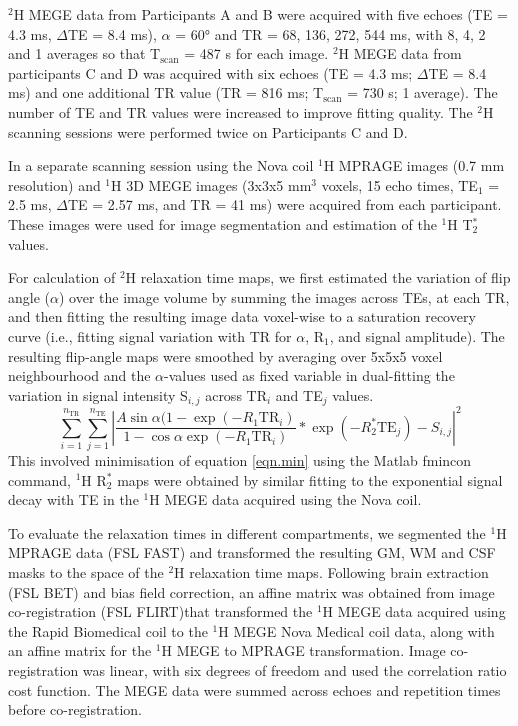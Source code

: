 \documentclass[class=article, crop=false]{standalone}
\begin{document}
$^2$H MEGE data from Participants A and B were acquired with five echoes (TE = 4.3 ms, $\Delta$TE = 8.4 ms), $\alpha$ = 60° and TR = 68, 136, 272, 544 ms, with 8, 4, 2 and 1 averages so that T$_\text{scan}$ = 487 s for each image. $^2$H MEGE data from participants C and D was acquired with six echoes (TE = 4.3 ms; $\Delta$TE = 8.4 ms) and one additional TR value (TR = 816 ms; T$_\text{scan}$ = 730 s; 1 average). 
The number of TE and TR values were increased to improve fitting quality. The $^2$H scanning sessions were performed twice on Participants C and D.

In a separate scanning session using the Nova coil $^1$H  MPRAGE images (0.7 mm resolution) and $^1$H 3D MEGE images (3x3x5 mm$^3$ voxels, 15 echo times, TE$_1$ = 2.5 ms, $\Delta$TE = 2.57 ms, and TR = 41 ms) were acquired from each participant. These images were used for image segmentation and estimation of the $^1$H T$_2^*$ values. 

For calculation of $^2$H relaxation time maps, we first estimated the variation of flip angle ($\alpha$) over the image volume by summing the images across TEs, at each TR, and then fitting the resulting image data voxel-wise to a saturation recovery curve (i.e., fitting signal variation with TR for $\alpha$, R$_1$, and signal amplitude). The resulting flip-angle maps were smoothed by averaging over 5x5x5 voxel neighbourhood and the $\alpha$-values used as fixed variable in dual-fitting the variation in signal intensity S$_{i,j}$ across TR$_i$ and TE$_j$  values. 
\begin{equation}
     \sum_{i=1}^{n_{\text{TR}}}\sum_{j=1}^{n_{\text{TE}}}\left|\frac{A\sin{\alpha}(1-\exp(-R_1 \text{TR}_i)}{1-\cos{\alpha}\exp(-R_1 \text{TR}_i)}*\exp(-R_2^*\text{TE}_j) - S_{i,j}\right|^2
     \label{eqn.min}
\end{equation}
This involved minimisation of equation \ref{eqn.min} using the Matlab fmincon command, $^1$H R$_2^*$ maps were obtained by similar fitting to the exponential signal decay with TE in the $^1$H MEGE data acquired using the Nova coil.

To evaluate the relaxation times in different compartments, we segmented the $^1$H MPRAGE data (FSL FAST\cite{Zhang2001SegmentationAlgorithm}) and transformed the resulting GM, WM and CSF masks to the space of the $^2$H relaxation time maps. Following brain extraction (FSL BET\cite{Smith2002FastExtraction}) and bias field correction, an affine matrix was obtained from image co-registration (FSL FLIRT\cite{Jenkinson2001AImages,Jenkinson2002ImprovedImages})that transformed the $^1$H MEGE data acquired using the Rapid Biomedical coil to the $^1$H MEGE Nova Medical coil data, along with an affine matrix for the $^1$H MEGE to MPRAGE transformation. Image co-registration was linear, with six degrees of freedom and used the correlation ratio cost function. The MEGE data were summed across echoes and repetition times before co-registration.
\end{document}

